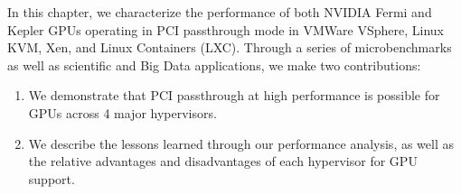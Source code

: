 In this chapter, we characterize the performance of both NVIDIA Fermi and Kepler GPUs
operating in PCI passthrough mode in VMWare VSphere, Linux KVM, Xen, and Linux
Containers (LXC).  Through a series of microbenchmarks as well as scientific and
Big Data applications, we make two contributions: 

\begin{enumerate}
\item We demonstrate that PCI passthrough at high performance is possible for
GPUs across 4 major hypervisors.
\item We describe the lessons learned through our performance analysis, as well as the relative advantages
and disadvantages of each hypervisor for GPU support.
\end{enumerate}









